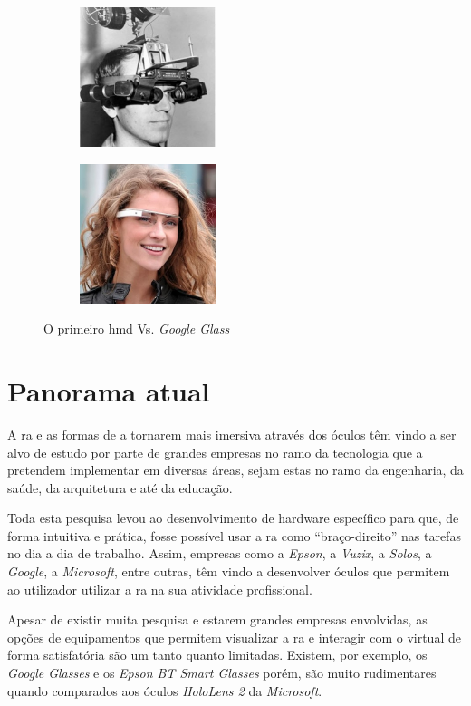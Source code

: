 \documentclass{report}
\begin{document}
\begin{figure}[H]
    \centering
    \begin{subfigure}{.5\textwidth}
      \centering
      \includegraphics[height=11em]{firsthmd.jpg}
      \label{Fig:hmd}
    \end{subfigure}%
    \begin{subfigure}{.5\textwidth}
      \centering
      \includegraphics[height=11em]{googleglass.jpg}
      \label{Fig:googleglass}
    \end{subfigure}
    \caption{O primeiro \ac{hmd} Vs. \textit{Google Glass}}
    \label{Fig:oculos}
\end{figure}

\section{Panorama atual}
A \ac{ra} e as formas de a tornarem mais imersiva através dos óculos têm vindo a ser alvo de estudo por parte de grandes empresas no ramo da tecnologia que a pretendem implementar em diversas áreas, sejam estas no ramo da engenharia, da saúde, da arquitetura e até da educação.

Toda esta pesquisa levou ao desenvolvimento de hardware específico para que, de forma intuitiva e prática, fosse possível usar a \ac{ra} como “braço-direito” nas tarefas no dia a dia de trabalho. Assim, empresas como a \textit{Epson}, a \textit{Vuzix}, a \textit{Solos}, a \textit{Google}, a \textit{Microsoft}, entre outras, têm vindo a desenvolver óculos que permitem ao utilizador utilizar a \ac{ra} na sua atividade profissional.

Apesar de existir muita pesquisa e estarem grandes empresas envolvidas, as opções de equipamentos que permitem visualizar a \ac{ra} e interagir com o virtual de forma satisfatória são um tanto quanto limitadas. Existem, por exemplo, os \textit{Google Glasses} e os \textit{Epson BT Smart Glasses} porém, são muito rudimentares quando comparados aos óculos \textit{HoloLens 2} da \textit{Microsoft}.
\end{document}

